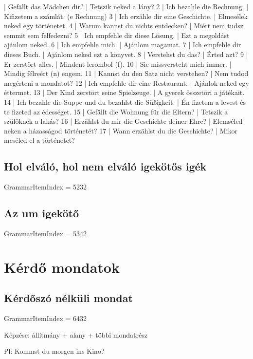 \documentclass{article}
\newenvironment{desc}{\verbatim}{\endverbatim}
\newenvironment{exmp}{\verbatim}{\endverbatim}
\begin{document}
\begin{exmp}
1 | Gefällt das Mädchen dir? | Tetszik neked a lány?
2 | Ich bezahle die Rechnung. | Kifizetem a számlát. (e Rechnung)
3 | Ich erzähle dir eine Geschichte. | Elmesélek neked egy történetet.
4 | Warum kannst du nichts entdecken? | Miért nem tudsz semmit sem felfedezni?
5 | Ich empfehle dir diese Lösung. | Ezt a megoldást ajánlom neked.
6 | Ich empfehle mich. | Ajánlom magamat.
7 | Ich empfehle dir dieses Buch. | Ajánlom neked ezt a könyvet.
8 | Verstehst du das? | Érted azt?
9 | Er zerstört alles. | Mindent lerombol (f).
10 | Sie missversteht mich immer. | Mindig félreért (n) engem.
11 | Kannst du den Satz nicht verstehen? | Nem tudod megérteni a mondatot?
12 | Ich empfehle dir eine Restaurant. | Ajánlok neked egy éttermet.
13 | Der Kind zerstört seine Spielzeuge. | A gyerek összetöri a játékait.
14 | Ich bezahle die Suppe und du bezahlst die Süßigkeit. | Én fizetem a levest és te fizeted az édességet.
15 | Gefällt die Wohnung für die Eltern? | Tetszik a szülőknek a lakás?
16 | Erzählst du mir die Geschichte deiner Ehre? | Elemséled neken a házasságod történetét?
17 | Wann erzählst du die Geschichte? | Mikor meséled el a történetet?
\end{exmp}

\subsection{Hol elváló, hol nem elváló igekötős igék}

GrammarItemIndex = 5232

\subsection{Az um igekötő}

GrammarItemIndex = 5342

\section{Kérdő mondatok}

\subsection{Kérdőszó nélküli mondat}

GrammarItemIndex = 6432

\begin{desc}
Képzése: állítmány + alany + többi mondatrész

Pl: Kommst du morgen ins Kino?
\end{desc}
\end{document}
